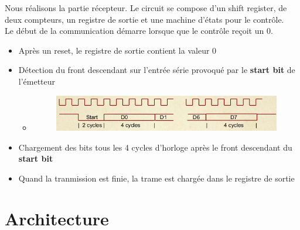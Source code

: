 \documentclass[a4paper]{article} %
\begin{document}


\begin{tcolorbox}[colframe=Monokaimagenta,colback=white]
Nous réalisons la partie récepteur. Le circuit se compose d'un shift register, de deux compteurs, un registre de sortie et une machine d'états pour le contrôle.\\
Le début de la communication démarre lorsque que le contrôle reçoit un $0$.

\begin{itemize}
    \item    Après un reset, le registre de sortie contient la valeur $0$
    \item    Détection du front descendant sur l'entrée série provoqué par le \textbf{start bit} de l'émetteur
        \begin{itemize}
            \item    \begin{figure}[H]
                        \centering
                        \includegraphics[width=.8\textwidth]{src/chrono_emetteur.jpg}
                     \label{fig:trame}
                \end{figure}
        \end{itemize}
    \item    Chargement des bits tous les 4 cycles d'horloge après le front descendant du \textbf{start bit}
    \item    Quand la tranmission est finie, la trame est chargée dans le registre de sortie
    
\end{itemize}   
\end{tcolorbox}

\section{Architecture}
\end{document}
